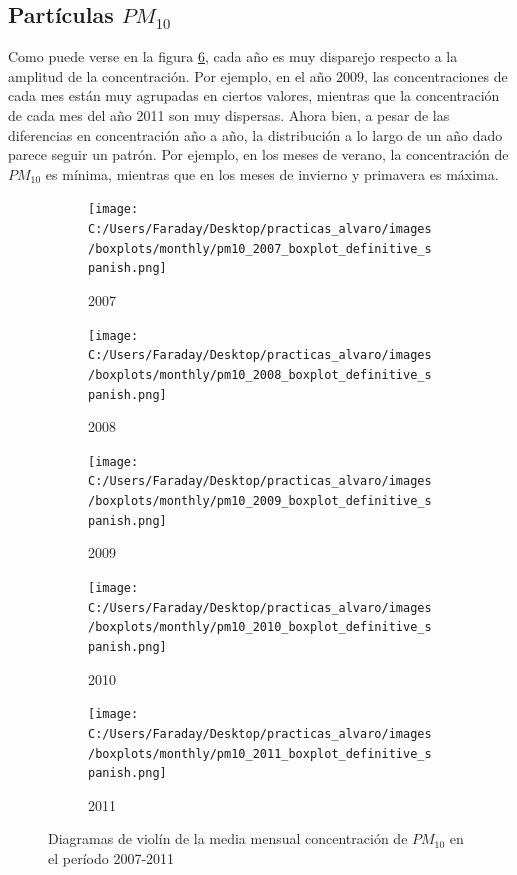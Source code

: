 \documentclass[12pt]{article}
\begin{document}
\subsection*{Partículas \textbf{\texorpdfstring{$PM_{10}$}{PM10}}}
%

Como puede verse en la figura \ref{fig:box-pm10-monthly}, cada año es muy disparejo respecto a la amplitud de la concentración. Por ejemplo, en el año 2009, las concentraciones de cada mes están muy agrupadas en ciertos valores, mientras que la concentración de cada mes del año 2011 son muy dispersas. Ahora bien, a pesar de las diferencias en concentración año a año, la distribución a lo largo de un año dado parece seguir un patrón. Por ejemplo, en los meses de verano, la concentración de $PM_{10}$ es mínima, mientras que en los meses de invierno y primavera es máxima.

\begin{figure}[H]
\centering
\begin{subfigure}[H]{0.45\textwidth}
\texttt{[image: C:/Users/Faraday/Desktop/practicas\_alvaro/images/boxplots/monthly/pm10\_2007\_boxplot\_definitive\_spanish.png]}
\captionsetup{labelformat=empty}
\caption{2007}
\label{fig:box-pm10-2007}
\end{subfigure}
%
\begin{subfigure}[H]{0.45\textwidth}
\texttt{[image: C:/Users/Faraday/Desktop/practicas\_alvaro/images/boxplots/monthly/pm10\_2008\_boxplot\_definitive\_spanish.png]}
\captionsetup{labelformat=empty}
\caption{2008}
\label{fig:box-pm10-2008}
\end{subfigure}

\begin{subfigure}[H]{0.45\textwidth}
\texttt{[image: C:/Users/Faraday/Desktop/practicas\_alvaro/images/boxplots/monthly/pm10\_2009\_boxplot\_definitive\_spanish.png]}
\captionsetup{labelformat=empty}
\caption{2009}
\label{fig:box-pm10-2009}
\end{subfigure}
%
\begin{subfigure}[H]{0.45\textwidth}
\texttt{[image: C:/Users/Faraday/Desktop/practicas\_alvaro/images/boxplots/monthly/pm10\_2010\_boxplot\_definitive\_spanish.png]}
\captionsetup{labelformat=empty}
\caption{2010}
\label{fig:box-pm10-2010}
\end{subfigure}

\begin{subfigure}[H]{0.45\textwidth}
\texttt{[image: C:/Users/Faraday/Desktop/practicas\_alvaro/images/boxplots/monthly/pm10\_2011\_boxplot\_definitive\_spanish.png]}
\captionsetup{labelformat=empty}
\caption{2011}
\label{fig:box-pm10-2011}
\end{subfigure}
\caption{Diagramas de violín de la media mensual concentración de $PM_{10}$ en el período 2007-2011}
\label{fig:box-pm10-monthly}
\end{figure}
\end{document}
